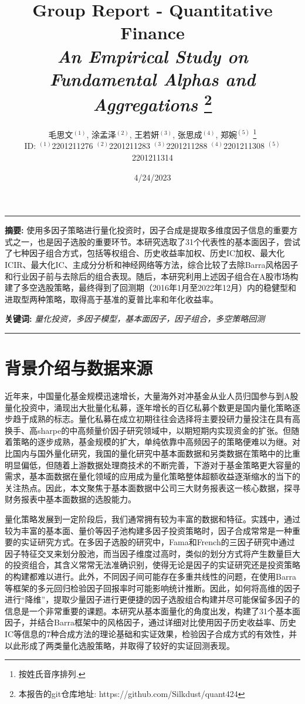 \documentclass[11pt]{article}
\title{\textbf{Group Report - Quantitative Finance}\\
\textit{An Empirical Study on Fundamental Alphas and Aggregations} \footnote{本报告的git仓库地址: https://github.com/Silkdust/quant424}}
\author{\Large 毛思文$^{(1)}$, 涂孟泽$^{(2)}$, 王若妍$^{(3)}$, 张思成$^{(4)}$, 郑婉$^{(5)}$  \footnote{按姓氏音序排列.} \\
   ID: $^{(1)}$2201211276 $^{(2)}$2201211283 $^{(3)}$2201211288 $^{(4)}$2201211308 $^{(5)}$2201211314}
\date{4/24/2023}
\begin{document}
\maketitle

\noindent
\rule[0.2\baselineskip]{\textwidth}{1pt}
        \large \textbf{摘要:  }\normalsize 使用多因子策略进行量化投资时，因子合成是提取多维度因子信息的重要方式之一，也是因子选股的重要环节。本研究选取了31个代表性的基本面因子，尝试了七种因子组合方式，包括等权组合、历史收益率加权、历史IC加权、最大化ICIR、最大化IC、主成分分析和神经网络等方法，综合比较了去除Barra风格因子和行业因子前与去除后的组合表现。随后，本研究利用上述因子组合在A股市场构建了多空选股策略，最终得到了回测期（2016年1月至2022年12月）内的稳健型和进取型两种策略，取得高于基准的夏普比率和年化收益率。
        
        \noindent
        \large \textbf{关键词:  }\normalsize \textit{量化投资，多因子模型，基本面因子，因子组合，多空策略回测}\\
\rule[0.2\baselineskip]{\textwidth}{1pt}

\section{背景介绍与数据来源}
近年来，中国量化基金规模迅速增长，大量海外对冲基金从业人员归国参与到A股量化投资中，涌现出大批量化私募，逐年增长的百亿私募个数更是国内量化策略逐步趋于成熟的标志。量化私募在成立初期往往会选择将主要投研力量投注在具有高换手、高sharpe的中高频量价因子研究领域中，以期短期内实现资金的扩张。但随着策略的逐步成熟，基金规模的扩大，单纯依靠中高频因子的策略便难以为继。对比国内与国外量化研究，我国的量化研究中基本面数据和另类数据在策略中的比重明显偏低，但随着上游数据处理商技术的不断完善，下游对于基金策略更大容量的需求，基本面数据在量化领域的应用成为量化策略整体超额收益逐渐缩水的当下的关注热点。因此，本文聚焦于基本面数据中公司三大财务报表这一核心数据，探寻财务报表中基本面数据的选股能力。

量化策略发展到一定阶段后，我们通常拥有较为丰富的数据和特征。实践中，通过较为丰富的基本面、量价等因子池构建多因子投资策略时，因子合成常常是一种重要的实证研究方式。在多因子选股的研究中，Fama和French\cite{fama1970efficient}的三因子研究中通过因子特征交叉来划分股池，而当因子维度过高时，类似的划分方式将产生数量巨大的投资组合，其含义常常无法准确识别，使得无论是因子的实证研究还是投资策略的构建都难以进行。此外，不同因子间可能存在多重共线性的问题，在使用Barra等框架的多元回归检验因子回报率时可能影响统计推断。因此，如何将高维的因子进行“降维”，提取少量因子进行更便捷的因子选股组合构建并尽可能保留多因子的信息是一个非常重要的课题。本研究从基本面量化的角度出发，构建了31个基本面因子，并结合Barra框架中的风格因子，通过详细对比使用因子历史收益率、历史IC等信息的7种合成方法的理论基础和实证效果，检验因子合成方式的有效性，并以此形成了两类量化选股策略，并取得了较好的实证回测表现。
\end{document}
